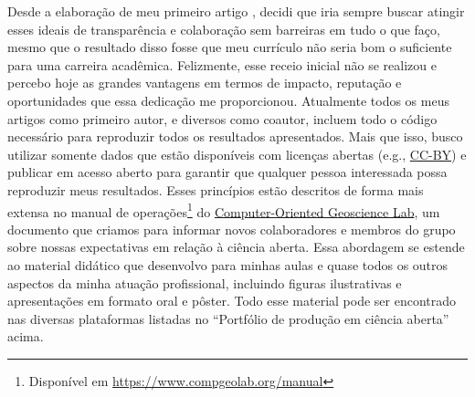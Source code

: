 \documentclass[12pt,a4paper,oneside]{book}
\newcommand{\CompGeoLabLink}{\href{https://www.compgeolab.org/}{Computer-Oriented Geoscience Lab}}
\begin{document}
Desde a elaboração de meu primeiro artigo \citep{Uieda2012}, decidi que iria
sempre buscar atingir esses ideais de transparência e colaboração sem barreiras
em tudo o que faço, mesmo que o resultado disso fosse que meu currículo não
seria bom o suficiente para uma carreira acadêmica.
Felizmente, esse receio inicial não se realizou e percebo hoje as grandes
vantagens em termos de impacto, reputação e oportunidades que essa dedicação me
proporcionou.
Atualmente todos os meus artigos como primeiro autor, e diversos como coautor,
incluem todo o código necessário para reproduzir todos os resultados
apresentados.
Mais que isso, busco utilizar somente dados que estão disponíveis com
licenças abertas (e.g., \href{https://creativecommons.org/licenses/by/4.0/}{CC-BY})
e publicar em acesso aberto para garantir que qualquer pessoa interessada
possa reproduzir meus resultados.
Esses princípios estão descritos de forma mais extensa no manual de
operações\footnote{Disponível em \url{https://www.compgeolab.org/manual}}
do \CompGeoLabLink{}, um documento que criamos para informar novos
colaboradores e membros do grupo sobre nossas expectativas em relação à ciência
aberta.
Essa abordagem se estende ao material didático que desenvolvo para minhas aulas
e quase todos os outros aspectos da minha atuação profissional, incluindo
figuras ilustrativas e apresentações em formato oral e pôster.
Todo esse material pode ser encontrado nas diversas plataformas listadas no
``Portfólio de produção em ciência aberta'' acima.
\end{document}

